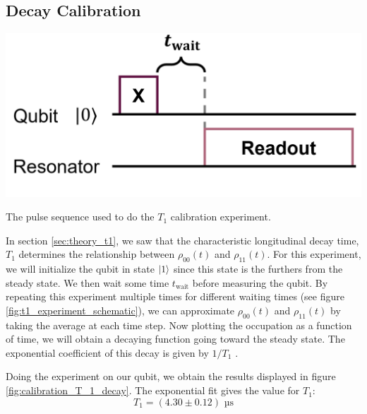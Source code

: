 \subsection{Decay Calibration}\label{sec:calibration_t1}
\begin{marginfigure}[5 cm]
    \centering
    \includegraphics[]{Figs/circuits/t1.png}
    \caption{The pulse sequence used to do the $T_1$ calibration experiment.}
    \label{fig:t1_experiment_schematic}
\end{marginfigure}
In section \ref{sec:theory_t1}, we saw that the characteristic longitudinal decay time, $T_1$ determines the relationship between $\rho_{00}(t)$ and $\rho_{11}(t)$. For this experiment, we will initialize the qubit in state $\ket{1}$ since this state is the furthers from the steady state. We then wait some time $t_{\text{wait}}$ before measuring the qubit. By repeating this experiment multiple times for different waiting times (see figure \ref{fig:t1_experiment_schematic}), we can approximate  $\rho_{00}(t)$ and $\rho_{11}(t)$ by taking the average at each time step. Now plotting the occupation as a function of time, we will obtain a decaying function going toward the steady state. The exponential coefficient of this decay is given by $1/T_1$ \cite{krantz_quantum_2019}. 

Doing the experiment on our qubit, we obtain the results displayed in figure \ref{fig:calibration_T_1_decay}. The exponential fit gives the value for $T_1$:
\begin{equation}
    T_1 = (4.30 \pm 0.12) \text{ µs}
\end{equation}

